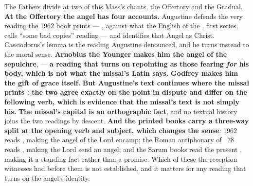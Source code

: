The Fathers divide at two of this Mass's chants, the Offertory and the
Gradual. \textbf{At the Offertory the angel has four
accounts.} Augustine defends the very reading the 1962 book prints ---
, against what the English of the , first series, calls ``some bad copies'' reading
 --- and identifies that Angel as Christ.
Cassiodorus's lemma is the reading Augustine denounced, and he turns instead to
the moral sense. \textbf{Arnobius the Younger makes him the angel of the
sepulchre},  --- \textbf{a reading that
turns on repointing  as those fearing \emph{for} his body,
which is not what the missal's Latin says.} \textbf{Godfrey makes him the gift
of grace itself.} \textbf{But Augustine's text continues 
where the missal prints : the two agree exactly on the
point in dispute and differ on the following verb, which is evidence that the
missal's text is not simply his.} \textbf{The missal's capital 
is an orthographic fact}, and no textual history joins the two readings by
descent. \textbf{And the printed books carry a three-way split at the opening
verb and subject, which changes the sense}: 1962 reads , making the angel of the Lord encamp; the Roman antiphonary of
~78 reads , making the
Lord send an angel; and the Sarum books read the present ,
making it a standing fact rather than a promise. Which of these the reception
witnesses had before them is not established, and it matters for any reading
that turns on the angel's identity.

